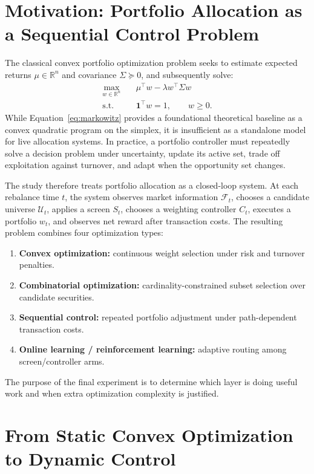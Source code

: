 \documentclass[journal,10pt]{IEEEtran}
\newcommand{\R}{\mathbb{R}}
\newcommand{\one}{\mathbf{1}}
\begin{document}
\section{Motivation: Portfolio Allocation as a Sequential Control Problem}
The classical convex portfolio optimization problem seeks to estimate expected returns $\mu\in\R^n$ and covariance $\Sigma\succeq0$, and subsequently solve:
\begin{equation}
\begin{aligned}
\max_{w\in\R^n}\quad & \mu^\top w - \lambda w^\top \Sigma w\\
\text{s.t.}\quad & \one^\top w = 1,\qquad w\ge 0.
\end{aligned}
\label{eq:markowitz}
\end{equation}
While Equation~\ref{eq:markowitz} provides a foundational theoretical baseline as a convex quadratic program on the simplex, it is insufficient as a standalone model for live allocation systems. In practice, a portfolio controller must repeatedly solve a decision problem under uncertainty, update its active set, trade off exploitation against turnover, and adapt when the opportunity set changes.

The study therefore treats portfolio allocation as a closed-loop system. At each rebalance time $t$, the system observes market information $\mathcal{F}_t$, chooses a candidate universe $\mathcal{U}_t$, applies a screen $S_t$, chooses a weighting controller $C_t$, executes a portfolio $w_t$, and observes net reward after transaction costs. The resulting problem combines four optimization types:
\begin{enumerate}[leftmargin=1.5em]
    \item \textbf{Convex optimization:} continuous weight selection under risk and turnover penalties.
    \item \textbf{Combinatorial optimization:} cardinality-constrained subset selection over candidate securities.
    \item \textbf{Sequential control:} repeated portfolio adjustment under path-dependent transaction costs.
    \item \textbf{Online learning / reinforcement learning:} adaptive routing among screen/controller arms.
\end{enumerate}
The purpose of the final experiment is to determine which layer is doing useful work and when extra optimization complexity is justified.

\section{From Static Convex Optimization to Dynamic Control}
\end{document}
